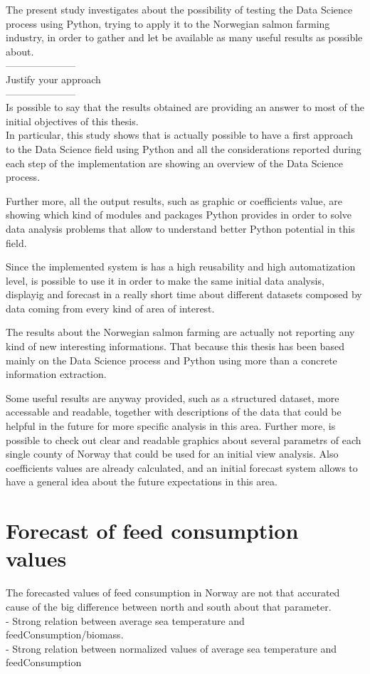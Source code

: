 
The present study investigates about the possibility of testing the Data Science process using Python, trying to apply it to the Norwegian salmon farming industry, in order to gather and let be available as many useful results as possible about.\\
---------------------\\
Justify your approach\\
---------------------\\
Is possible to say that the results obtained are providing an answer to most of the initial objectives of this thesis. \\
In particular, this study shows that is actually possible to have a first approach to the Data Science field using Python and all the considerations reported during each step of the implementation are showing an overview of the Data Science process.

Further more, all the output results, such as graphic or coefficients value, are showing which kind of modules and packages Python provides in order to solve data analysis problems that allow to understand better Python potential in this field.

Since the implemented system is has a high reusability and high automatization level, is possible to use it in order to make the same initial data analysis, displayig and forecast in a really short time about different datasets composed by data coming from every kind of area of interest.

The results about the Norwegian salmon farming are actually not reporting any kind of new interesting informations. That because this thesis has been based mainly on the Data Science process and Python using more than a concrete information extraction.

Some useful results are anyway provided, such as a structured dataset, more accessable and readable, together with descriptions of the data that could be helpful in the future for more specific analysis in this area. Further more, is possible to check out clear and readable graphics about several parametrs of each single county of Norway that could be used for an initial view analysis. Also coefficients values are already calculated, and an initial forecast system allows to have a general idea about the future expectations in this area.


\newpage

\section{Forecast of feed consumption values}
The forecasted values of feed consumption in Norway are not that accurated cause of the big difference between north and south about that parameter. \\
- Strong relation between average sea temperature and feedConsumption/biomass. \\
- Strong relation between normalized values of average sea temperature and feedConsumption

